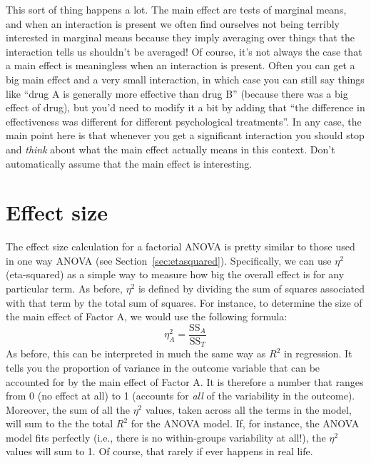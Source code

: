 This sort of thing happens a lot. The main effect are tests of marginal means, and when an interaction is present we often find ourselves not being terribly interested in marginal means because they imply averaging over things that the interaction tells us shouldn't be averaged! Of course, it's not always the case that a main effect is meaningless when an interaction is present. Often you can get a big main effect and a very small interaction, in which case you can still say things like ``drug A is generally more effective than drug B'' (because there was a big effect of drug), but you'd need to modify it a bit by adding that ``the difference in effectiveness was different for different psychological treatments''. In any case, the main point here is that whenever you get a significant interaction you should stop and {\it think} about what the main effect actually means in this context. Don't automatically assume that the main effect is interesting. 


\section{Effect size~\label{sec:effectsizefactorialanova}}

The effect size calculation for a factorial ANOVA is pretty similar to those used in one way ANOVA (see Section~\ref{sec:etasquared}). Specifically, we can use $\eta^2$ (eta-squared) as a simple way to measure how big the overall effect is for any particular term. As before, $\eta^2$ is defined by dividing the sum of squares associated with that term by the total sum of squares. For instance, to determine the size of the main effect of Factor A, we would use the following formula:
$$
\eta_A^2 = \frac{\mbox{SS}_{A}}{\mbox{SS}_{T}}
$$
As before, this can be interpreted in much the same way as $R^2$ in regression.  It tells you the proportion of variance in the outcome variable that can be accounted for by the main effect of Factor A. It is therefore a number that ranges from 0 (no effect at all) to 1 (accounts for {\it all} of the variability in the outcome). Moreover, the sum of all the $\eta^2$ values, taken across all the terms in the model, will sum to the the total $R^2$ for the ANOVA model. If, for instance, the ANOVA model fits perfectly (i.e., there is no within-groups variability at all!), the $\eta^2$ values will sum to 1. Of course, that rarely if ever happens in real life.

